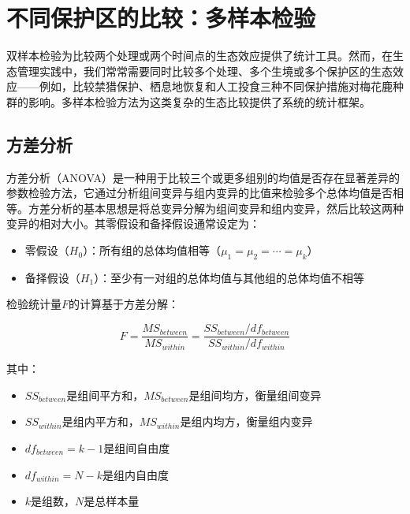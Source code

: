 \documentclass[
  twoside,12pt,fontset=none]{ctexbook}
\providecommand{\tightlist}{%
  \setlength{\itemsep}{0pt}\setlength{\parskip}{0pt}}
\begin{document}
\hypertarget{ux4e0dux540cux4fddux62a4ux533aux7684ux6bd4ux8f83ux591aux6837ux672cux68c0ux9a8c}{%
\section{不同保护区的比较：多样本检验}\label{ux4e0dux540cux4fddux62a4ux533aux7684ux6bd4ux8f83ux591aux6837ux672cux68c0ux9a8c}}

双样本检验为比较两个处理或两个时间点的生态效应提供了统计工具。然而，在生态管理实践中，我们常常需要同时比较多个处理、多个生境或多个保护区的生态效应------例如，比较禁猎保护、栖息地恢复和人工投食三种不同保护措施对梅花鹿种群的影响。多样本检验方法为这类复杂的生态比较提供了系统的统计框架。

\hypertarget{ux65b9ux5deeux5206ux6790}{%
\subsection{方差分析}\label{ux65b9ux5deeux5206ux6790}}

方差分析（ANOVA）是一种用于比较三个或更多组别的均值是否存在显著差异的参数检验方法，它通过分析组间变异与组内变异的比值来检验多个总体均值是否相等。方差分析的基本思想是将总变异分解为组间变异和组内变异，然后比较这两种变异的相对大小。其零假设和备择假设通常设定为：

\begin{itemize}
\tightlist
\item
  零假设（\(H_0\)）：所有组的总体均值相等（\(\mu_1 = \mu_2 = \cdots = \mu_k\)）
\item
  备择假设（\(H_1\)）：至少有一对组的总体均值与其他组的总体均值不相等
\end{itemize}

检验统计量\(F\)的计算基于方差分解：

\[F = \frac{MS_{between}}{MS_{within}} = \frac{SS_{between} / df_{between}}{SS_{within} / df_{within}}\]

其中：

\begin{itemize}
\tightlist
\item
  \(SS_{between}\)是组间平方和，\(MS_{between}\)是组间均方，衡量组间变异
\item
  \(SS_{within}\)是组内平方和，\(MS_{within}\)是组内均方，衡量组内变异
\item
  \(df_{between} = k - 1\)是组间自由度
\item
  \(df_{within} = N - k\)是组内自由度
\item
  \(k\)是组数，\(N\)是总样本量
\end{itemize}
\end{document}
